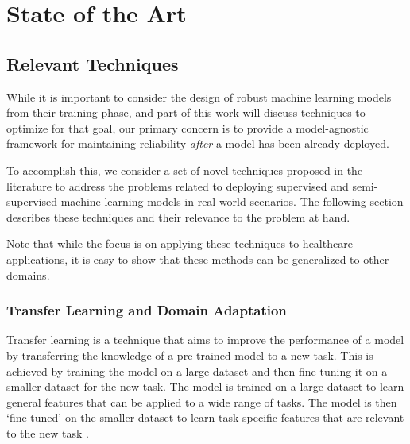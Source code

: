 \documentclass[../main.tex]{subfiles}
\begin{document}
    \chapter{State of the Art} \label{chap:state_of_the_art} 

    \section{Relevant Techniques} \label{sec:relevant_techniques} 

    While it is important to consider the design of robust machine learning models from their training phase, and part of this work will discuss techniques to optimize for that goal, our primary concern is to provide a model-agnostic framework for maintaining reliability \textit{after} a model has been already deployed.
    
    To accomplish this, we consider a set of novel techniques proposed in the literature to address the problems related to deploying supervised and semi-supervised machine learning models in real-world scenarios. The following section describes these techniques and their relevance to the problem at hand. 
    
    Note that while the focus is on applying these techniques to healthcare applications, it is easy to show that these methods can be generalized to other domains.

    

    \subsection{Transfer Learning and Domain Adaptation} \label{sec:transfer_learning} 

    Transfer learning is a technique that aims to improve the performance of a model by transferring the knowledge of a pre-trained model to a new task. This is achieved by training the model on a large dataset and then fine-tuning it on a smaller dataset for the new task. The model is trained on a large dataset to learn general features that can be applied to a wide range of tasks. The model is then `fine-tuned' on the smaller dataset to learn task-specific features that are relevant to the new task \cite{pan_survey_2010}.
\end{document}
